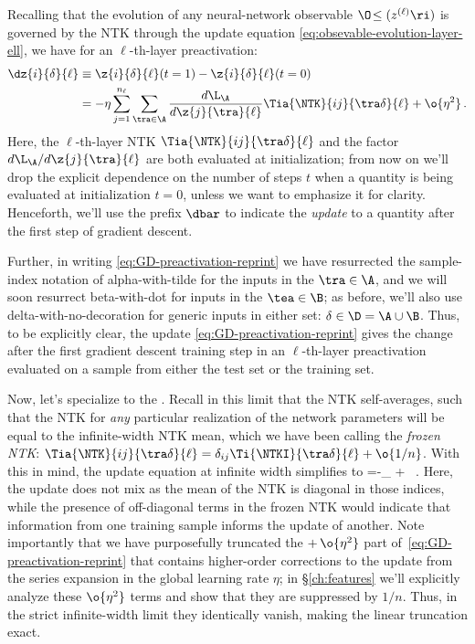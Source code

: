 Recalling that the  evolution of any neural-network observable $\O\!\le(z^{(\ell)}\ri)$  is governed by the NTK
through the update equation \eqref{eq:obsevable-evolution-layer-ell}, we have for an $\ell$-th-layer preactivation: %
\begin{align}\label{eq:GD-preactivation-reprint}
\dz{i}{\delta}{\ell}&\equiv \z{i}{\delta}{\ell}(t=1)- \z{i}{\delta}{\ell}(t=0) \, \\
&=-\eta\sum_{j=1}^{n_{\ell}}\sum_{\tra\in\A}\frac{d\L_{\A}}{d\z{j}{\tra}{\ell}} %
\Tia{\NTK}{ij}{\tra\delta}{\ell}+\o{\eta^2}\, . \notag
\end{align}
Here, the $\ell$-th-layer NTK $\Tia{\NTK}{ij}{\tra\delta}{\ell}$ and the factor $d\L_{\A}/d\z{j}{\tra}{\ell}$ are both evaluated at initialization; from now on we'll drop the explicit dependence on the number of steps $t$ when a quantity is  being evaluated at initialization $t=0$, unless we want to emphasize it for clarity. Henceforth, 
we'll  use the prefix $\dbar$  to indicate the \emph{update} to a quantity after the first step of gradient descent.

Further, in writing \eqref{eq:GD-preactivation-reprint} we have resurrected the sample-index notation of alpha-with-tilde for the inputs in the  $\tra \in\A$, and we will soon resurrect beta-with-dot for inputs in the  $\tea\in\B$; as before, we'll also use delta-with-no-decoration for generic inputs in either set: $\delta\in\D=\A\cup\B$. Thus, to be explicitly clear, the update \eqref{eq:GD-preactivation-reprint} gives the change after the first gradient descent training step in an $\ell$-th-layer preactivation evaluated on a sample from either the test set or the training set.




Now, let's specialize to the . Recall in this limit that the NTK self-averages, such that the NTK for \emph{any} particular realization of the network parameters will be equal to the infinite-width NTK mean, which we have been calling the \emph{frozen NTK}: $\Tia{\NTK}{ij}{\tra\delta}{\ell}=\delta_{ij}\Ti{\NTKI}{\tra\delta}{\ell} + \o{1/n}$. With this in mind, the update equation  at infinite width simplifies to 
\be\label{eq:GD-preactivation-at-infty}
=-\eta\sum_{\tra\in\A}\Ti{\NTKI}{\delta\tra}{\ell} + \oninv\, .
\ee
Here, the update does not mix  as the mean of the NTK is diagonal in those indices, while the presence of off-diagonal terms in the frozen NTK would indicate that information from one training sample informs the update of another.
Note importantly that we have purposefully truncated the  $+\, \o{\eta^2}$ part of~\eqref{eq:GD-preactivation-reprint} that contains higher-order corrections to the update from the series expansion in the global learning rate $\eta$; in \S\ref{ch:features} we'll explicitly analyze these $\o{\eta^2}$ terms and show that they are suppressed by $1/n$.
Thus, in the strict infinite-width limit they identically vanish, making the linear truncation exact.


